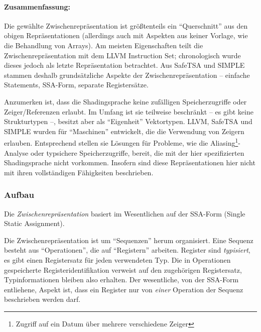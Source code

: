 \documentclass[twoside,a4paper,fleqn,12pt]{article}
\begin{document}

\paragraph{Zusammenfassung:}
Die gewählte Zwischenrepräsentation ist größtenteils ein "`Querschnitt"' aus den obigen Repräsentationen
(allerdings auch mit Aspekten aus keiner Vorlage, wie die Behandlung von Arrays). Am meisten Eigenschaften
teilt die Zwischenrepräsentation mit dem LLVM Instruction Set; chronologisch wurde dieses jedoch als letzte
Repräsentation betrachtet. Aus SafeTSA und SIMPLE stammen deshalb grundsätzliche Aspekte der Zwischenrepräsentation 
-- einfache Statements, SSA-Form, separate Registersätze.

Anzumerken ist, dass die Shadingsprache keine zufälligen Speicherzugriffe oder Zeiger/Referenzen erlaubt.
Im Umfang ist sie teilweise beschränkt -- es gibt keine Strukturtypen --, besitzt aber als "`Eigenheit"' Vektortypen.
LLVM, SafeTSA und SIMPLE wurden für "`Maschinen"' entwickelt, die die Verwendung von Zeigern erlauben. Entsprechend
stellen sie Lösungen für Probleme, wie die Aliasing\footnote{Zugriff auf ein Datum über mehrere verschiedene Zeiger}-Analyse oder typsichere Speicherzugriffe, bereit, die mit
der hier spezifizierten Shadingsprache nicht vorkommen. Insofern sind diese Repräsentationen hier nicht
mit ihren vollständigen Fähigkeiten beschrieben.

\subsubsection{Aufbau}

Die \emph{Zwischenrepräsentation} basiert im Wesentlichen auf der SSA-Form (Single Static Assignment).


Die Zwischenrepräsentation ist um "`Sequenzen"' herum organisiert. Eine Sequenz besteht aus "`Operationen"',
die auf "`Registern"' arbeiten. Register sind \emph{typisiert}, es gibt einen Registersatz für jeden verwendeten Typ.
Die in Operationen gespeicherte Registeridentifikation verweist auf den zugehörigen Registersatz, Typinformationen bleiben also erhalten.
Der wesentliche, von der SSA-Form entliehene, Aspekt ist, dass ein Register nur von \emph{einer} Operation der Sequenz beschrieben werden darf.
\end{document}
